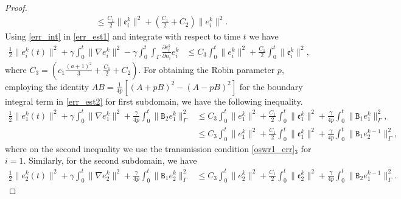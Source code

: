 \documentclass[10pt,a4paper]{amsart}
\begin{document}
\begin{proof}
\begin{equation}
\begin{aligned}
&\leq \frac{C_1}{2} \parallel \mathfrak{e}_i^{k}\parallel^2 + \left( \frac{C_1}{2} + C_2\right) \parallel e_i^{k}\parallel^2.
\end{aligned}
\end{equation}
Using \eqref{err_int} in \eqref{err_est1} and integrate with respect to time $t$ we have
\begin{equation}\label{err_est2}
\begin{aligned}
\frac{1}{2}\parallel e_i^{k}(t)\parallel^2 + \gamma\int_0^t\parallel\nabla e_i^{k} \parallel^2 -\gamma\int_0^t\int_{\Gamma} \frac{\partial e_i^{k}}{\partial n_i} e_i^{k} 
& \leq C_3 \int_0^t\parallel e_i^{k}\parallel^2 + \frac{C_1}{2} \int_0^t\parallel \mathfrak{e}_i^{k}\parallel^2,
\end{aligned}
\end{equation} 
where $C_3=\left( c_1\frac{(a+1)^2}{3}+\frac{C_1}{2} + C_2 \right)$. For obtaining the Robin parameter $p$, employing the identity $AB=\frac{1}{4p}\left[ (A+pB)^2 - (A-pB)^2\right]$ for the boundary integral term in \eqref{err_est2} for first subdomain, we have the following inequality. 
\begin{equation}\label{err_est3}
\begin{aligned}
\frac{1}{2}\parallel e_1^{k}(t)\parallel^2 + \gamma\int_0^t\parallel\nabla e_1^{k} \parallel^2 +\frac{\gamma}{4p}\int_0^t\parallel\mathtt{B}_2 e_1^{k}\parallel_{\Gamma}^2
& \leq C_3 \int_0^t\parallel e_1^{k}\parallel^2 + \frac{C_1}{2} \int_0^t\parallel \mathfrak{e}_1^{k}\parallel^2
 + \frac{\gamma}{4p}\int_0^t\parallel\mathtt{B}_1 e_1^{k}\parallel_{\Gamma}^2,\\
& \leq C_3 \int_0^t\parallel e_1^{k}\parallel^2 + \frac{C_1}{2} \int_0^t\parallel \mathfrak{e}_1^{k}\parallel^2
 + \frac{\gamma}{4p}\int_0^t\parallel\mathtt{B}_1 e_2^{k-1}\parallel_{\Gamma}^2,
\end{aligned}
\end{equation} 
where on the second inequality we use the transmission condition \eqref{oswr1_err}$_3$ for $i=1$. Similarly, for the second subdomain, we have 
\begin{equation}\label{err_est4}
\begin{aligned}
\frac{1}{2}\parallel e_2^{k}(t)\parallel^2 + \gamma\int_0^t\parallel\nabla e_2^{k} \parallel^2 +\frac{\gamma}{4p}\int_0^t\parallel\mathtt{B}_1 e_2^{k}\parallel_{\Gamma}^2
& \leq C_3 \int_0^t\parallel e_2^{k}\parallel^2 + \frac{C_1}{2} \int_0^t\parallel \mathfrak{e}_2^{k}\parallel^2
 + \frac{\gamma}{4p}\int_0^t\parallel\mathtt{B}_2 e_1^{k-1}\parallel_{\Gamma}^2.

\end{aligned}
\end{equation}
\end{proof}
\end{document}
